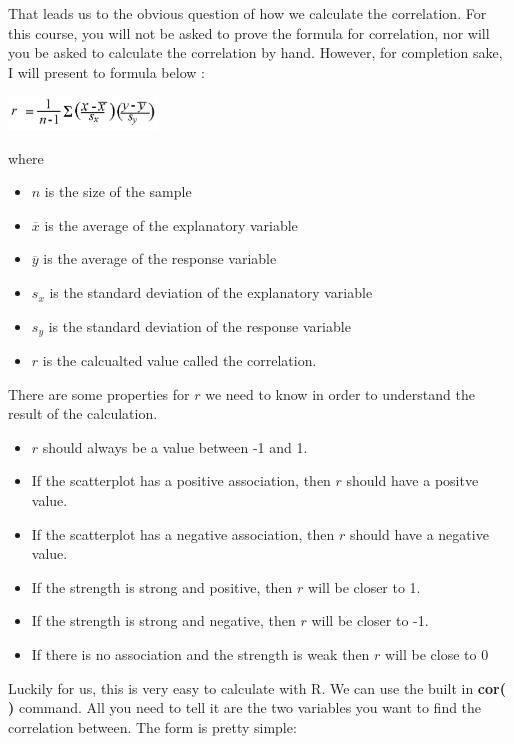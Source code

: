 \documentclass[
  letterpaper,
  DIV=11,
  numbers=noendperiod]{scrreprt}
\providecommand{\tightlist}{%
  \setlength{\itemsep}{0pt}\setlength{\parskip}{0pt}}\usepackage{longtable,booktabs,array}
\begin{document}
That leads us to the obvious question of how we calculate the
correlation. For this course, you will not be asked to prove the formula
for correlation, nor will you be asked to calculate the correlation by
hand. However, for completion sake, I will present to formula below :

\includegraphics[width=0.3\textwidth,height=\textheight]{./images/SC_7.jpg}

where

\begin{itemize}
\tightlist
\item
  \(n\) is the size of the sample
\item
  \(\overline{x}\) is the average of the explanatory variable
\item
  \(\overline{y}\) is the average of the response variable
\item
  \(s_x\) is the standard deviation of the explanatory variable
\item
  \(s_y\) is the standard deviation of the response variable
\item
  \(r\) is the calcualted value called the correlation.
\end{itemize}

There are some properties for \(r\) we need to know in order to
understand the result of the calculation.

\begin{itemize}
\tightlist
\item
  \(r\) should always be a value between -1 and 1.
\item
  If the scatterplot has a positive association, then \(r\) should have
  a positve value.
\item
  If the scatterplot has a negative association, then \(r\) should have
  a negative value.
\item
  If the strength is strong and positive, then \(r\) will be closer to
  1.
\item
  If the strength is strong and negative, then \(r\) will be closer to
  -1.
\item
  If there is no association and the strength is weak then \(r\) will be
  close to \(0\)
\end{itemize}

Luckily for us, this is very easy to calculate with R. We can use the
built in \textbf{cor( )} command. All you need to tell it are the two
variables you want to find the correlation between. The form is pretty
simple:
\end{document}
